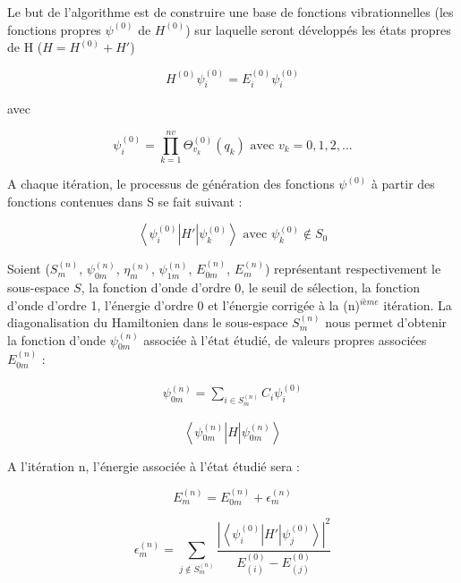 Le but de l'algorithme est de construire une base de fonctions vibrationnelles (les fonctions propres $\psi^{(0)}$ de $H^{(0)}$) sur laquelle seront développés les états propres de H ($H=H^{(0)} + H'$)

\begin{equation}
H^{(0)} \psi^{(0)}_{i} = E^{(0)}_{i}  \psi^{(0)}_{i} 
\end{equation}

avec

\begin{equation}
\psi^{(0)}_{i} = \prod^{nv}_{k=1} \Theta^{(0)}_{v_k}(q_k) \text{ avec } v_k = 0,1,2, ...
\end{equation}

A chaque itération, le processus de génération des fonctions $\psi^{(0)}$ à partir des fonctions contenues dans S se fait suivant :

\begin{equation} 
\left\langle \psi^{(0)}_{i} \right \vert H' \left  \vert \psi^{(0)}_{k} \right\rangle \text{ avec }  \psi^{(0)}_{k} \notin S_0
\end{equation}

Soient ($S^{(n)}_{m}$, $\psi^{(n)}_{0m}$, $\eta^{(n)}_{m}$, $\psi^{(n)}_{1m}$, $E^{(n)}_{0m}$, $E^{(n)}_{m}$) représentant respectivement le sous-espace $S$, la fonction d'onde d'ordre 0, le seuil de sélection, la fonction d'onde d'ordre 1, l'énergie d'ordre 0 et l'énergie corrigée à la (n)$^{ième}$ itération. La diagonalisation du Hamiltonien dans le sous-espace $S^{(n)}_{m}$ nous permet d'obtenir la fonction d'onde $\psi^{(n)}_{0m}$ associée à l'état étudié, de valeurs propres associées $E^{(n)}_{0m}$ :


\begin{align} \label{dev}
\psi^{(n)}_{0m} =  \sum_{i \in  S^{(n)}_{m}}  C_i \psi^{(0)}_{i}
\end{align}

\begin{equation}
\left\langle \psi^{(n)}_{0m} \right| H \left| \psi^{(n)}_{0m} \right\rangle 
\end{equation}

A l'itération n, l'énergie associée à l'état étudié sera :

\begin{equation}
E^{(n)}_{m} = E^{(n)}_{0m} + \epsilon^{(n)}_{m}
\end{equation}

\begin{equation}
\epsilon^{(n)}_{m} =  \sum_{j \notin  S^{(n)}_{m}}  \frac{\left| \left\langle \psi^{(0)}_{i} \right| H' \left| \psi^{(0)}_{j} \right\rangle \right|^2}       {E^{(0)}_{(i)} - E^{(0)}_{(j)}}
\end{equation}

